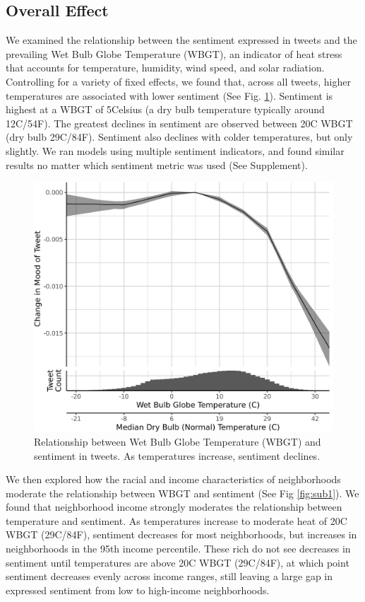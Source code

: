 \documentclass[fleqn,10pt]{wlscirep}
\begin{document}
\subsection*{Overall Effect}
We examined the relationship between the sentiment expressed in tweets and the prevailing Wet Bulb Globe Temperature (WBGT), an indicator of heat stress that accounts for temperature, humidity, wind speed, and solar radiation.  Controlling for a variety of fixed effects, we found that, across all tweets, higher temperatures are associated with lower sentiment (See Fig. \ref{fig:wbgt}).  Sentiment is highest at a WBGT of 5\textdegree Celsius (a dry bulb temperature typically around 12\textdegree C/54\textdegree F).  The greatest declines in sentiment are observed between 20\textdegree C WBGT (dry bulb 29\textdegree C/84\textdegree F).  Sentiment also declines with colder temperatures, but only slightly.  We ran models using multiple sentiment indicators, and found similar results no matter which sentiment metric was used (See Supplement).

\begin{figure}[H]
  \centering
  \includegraphics[width=0.5\linewidth]{../res/wbgt.png}
  \caption{Relationship between Wet Bulb Globe Temperature (WBGT) and sentiment in tweets.  As temperatures increase, sentiment declines.}
  \label{fig:wbgt}
\end{figure}

We then explored how the racial and income characteristics of neighborhoods moderate the relationship between WBGT and sentiment (See Fig \ref{fig:sub1}).  We found that neighborhood income strongly moderates the relationship between temperature and sentiment.  As temperatures increase to moderate heat of 20\textdegree C WBGT (29\textdegree C/84\textdegree F), sentiment decreases for most neighborhoods, but increases in neighborhoods in the 95th income percentile.  These rich do not see decreases in sentiment until temperatures are above 20\textdegree C WBGT (29\textdegree C/84\textdegree F), at which point sentiment decreases evenly across income ranges, still leaving a large gap in expressed sentiment from low to high-income neighborhoods.
\end{document}
